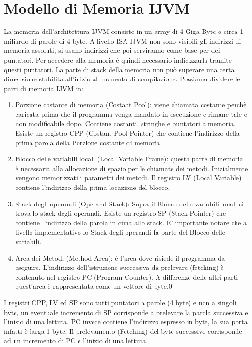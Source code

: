 \section{Modello di Memoria IJVM}
La memoria dell'architettura IJVM consiste in un array di 4 Giga Byte o circa 1 miliardo di parole di 4 byte.
A livello ISA-IJVM non sono visibili gli indirizzi di memoria assoluti, si usano indirizzi che poi serviranno come base per dei puntatori. Per accedere alla memoria è quindi necessario indicizzarla tramite questi puntatori. La parte di stack della memoria non può superare una certa dimensione stabilita all'inizio al momento di compilazione.
Possiamo dividere le parti di memoria IJVM in:
\begin{enumerate}
\item Porzione costante di memoria (Costant Pool): viene chiamata costante perchè caricata prima che il programma venga mandato in esecuzione e rimane tale e non modificabile dopo. Contiene costanti, stringhe e puntatori a memoria. Esiste un registro CPP (Costant Pool Pointer) che contiene l'indirizzo della prima parola della Porzione costante di memoria
\item Blocco delle variabili locali (Local Variable Frame): questa parte di memoria è necessaria alla allocazione di spazio per le chiamate dei metodi. Inizialmente vengono memorizzati i parametri dei metodi. Il registro LV (Local Variable) contiene l'indirizzo della prima locazione del blocco.
\item Stack degli operandi (Operand Stack): Sopra il Blocco delle variabili locali si trova lo stack degli operandi. Esiste un registro SP (Stack Pointer) che contiene l'indirizzo della parola in cima allo stack. E' importante notare che a livello implementativo lo Stack degli operandi fa parte del Blocco delle variabili.
\item Area dei Metodi (Method Area): è l'area dove risiede il programma da eseguire.  L'indirizzo dell'istruzione successiva da prelevare (fetching) è contenuto nel registro PC (Program Counter). A differenze delle altri parti quest'area è rappresentata come un vettore di byte.0 
\end{enumerate}
I registri CPP, LV ed SP sono tutti puntatori a parole (4 byte) e non a singoli byte, un eventuale incremento di SP corrisponde a prelevare la parola successiva e l'inizio di una lettura. PC invece contiene l'indirizzo espresso in byte, la sua porta infatti è larga 1 byte. Il prelevamento (Fetching) del byte successivo corrisponde ad un incremento di PC e l'inizio di una lettura.
